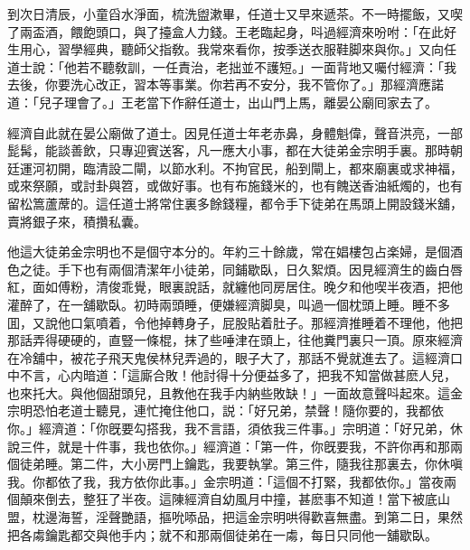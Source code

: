 到次日清辰，小童舀水淨面，梳洗盥漱畢，任道士又早來遞茶。不一時擺飯，又喫了兩盃酒，餵飽頭口，與了擡盒人力錢。王老臨起身，呌過經濟來吩咐：「在此好生用心，習學經典，聽師父指敎。我常來看你，按季送衣服鞋脚來與你。」又向任道士說：「他若不聽敎訓，一任責治，老拙並不護短。」一面背地又囑付經濟：「我去後，你要洗心改正，習本等事業。你若再不安分，我不管你了。」那經濟應諾道：「兒子理會了。」王老當下作辭任道士，出山門上馬，離晏公廟囘家去了。

經濟自此就在晏公廟做了道士。因見任道士年老赤鼻，身體魁偉，聲音洪亮，一部髭髯，能談善飲，只專迎賓送客，凡一應大小事，都在大徒弟金宗明手裏。那時朝廷運河初開，臨清設二閘，以節水利。不拘官民，船到閘上，都來廟裏或求神福，或來祭願，或討卦與笤，或做好事。也有布施錢米的，也有餽送香油紙燭的，也有留松篙蘆蓆的。這任道士將常住裏多餘錢糧，都令手下徒弟在馬頭上開設錢米舖，賣將銀子來，積攢私囊。

他這大徒弟金宗明也不是個守本分的。年約三十餘歲，常在娼樓包占楽婦，是個酒色之徒。手下也有兩個清潔年小徒弟，同鋪歇臥，日久絮煩。因見經濟生的齒白唇紅，面如傅粉，清俊乖覺，眼裏說話，就纏他同房居住。晚夕和他喫半夜酒，把他灌醉了，在一舖歇臥。初時兩頭睡，便嫌經濟脚臭，叫過一個枕頭上睡。睡不多囬，又說他口氣噴着，令他掉轉身子，屁股貼着肚子。那經濟推睡着不理他，他把那話弄得硬硬的，直豎一條棍，抹了些唾津在頭上，往他糞門裏只一頂。原來經濟在冷舖中，被花子飛天鬼侯林兒弄過的，眼子大了，那話不覺就進去了。這經濟口中不言，心内暗道：「這廝合敗！他討得十分便益多了，把我不知當做甚麽人兒，也來托大。與他個甜頭兒，且教他在我手内納些敗缺！」一面故意聲呌起來。這金宗明恐怕老道士聽見，連忙掩住他口，説：「好兄弟，禁聲！隨你要的，我都依你。」經濟道：「你旣要勾搭我，我不言語，須依我三件事。」宗明道：「好兄弟，休說三件，就是十件事，我也依你。」經濟道：「第一件，你旣要我，不許你再和那兩個徒弟睡。第二件，大小房門上鑰匙，我要執掌。第三件，隨我往那裏去，你休嗔我。你都依了我，我方依你此事。」金宗明道：「這個不打緊，我都依你。」當夜兩個顛來倒去，整狂了半夜。這陳經濟自幼風月中撞，甚麽事不知道！當下被底山盟，枕邊海誓，淫聲艷語，摳吮㖭品，把這金宗明哄得歡喜無盡。到第二日，果然把各䖏鑰匙都交與他手内；就不和那兩個徒弟在一䖏，每日只同他一舖歇臥。

